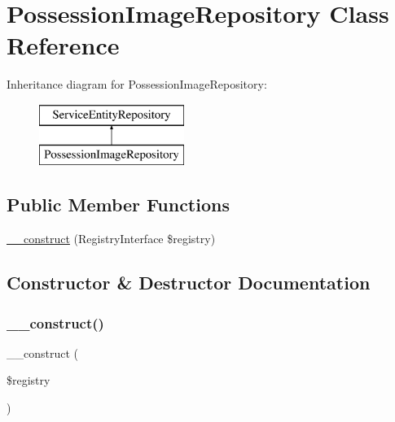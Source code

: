 \hypertarget{class_app_1_1_repository_1_1_possession_image_repository}{}\section{Possession\+Image\+Repository Class Reference}
\label{class_app_1_1_repository_1_1_possession_image_repository}
Inheritance diagram for Possession\+Image\+Repository\+:\begin{figure}[H]
\begin{center}
\leavevmode
\includegraphics[height=2.000000cm]{class_app_1_1_repository_1_1_possession_image_repository}
\end{center}
\end{figure}
\subsection*{Public Member Functions}
\begin{DoxyCompactItemize}
\item 
\mbox{\hyperlink{class_app_1_1_repository_1_1_possession_image_repository_aadca7edd263e228921a1860bb6b9c252}{\+\_\+\+\_\+construct}} (Registry\+Interface \$registry)
\end{DoxyCompactItemize}


\subsection{Constructor \& Destructor Documentation}
\mbox{\label{class_app_1_1_repository_1_1_possession_image_repository_aadca7edd263e228921a1860bb6b9c252}} 
\subsubsection{\texorpdfstring{\_\_construct()}{\_\_construct()}}
{\footnotesize\ttfamily \+\_\+\+\_\+construct (\begin{DoxyParamCaption}\item[{Registry\+Interface}]{\$registry }\end{DoxyParamCaption})}

